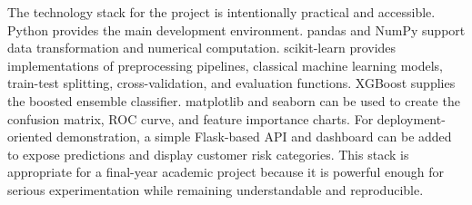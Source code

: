 The technology stack for the project is intentionally practical and accessible. Python provides the main development environment. pandas and NumPy support data transformation and numerical computation. scikit-learn provides implementations of preprocessing pipelines, classical machine learning models, train-test splitting, cross-validation, and evaluation functions. XGBoost supplies the boosted ensemble classifier. matplotlib and seaborn can be used to create the confusion matrix, ROC curve, and feature importance charts. For deployment-oriented demonstration, a simple Flask-based API and dashboard can be added to expose predictions and display customer risk categories. This stack is appropriate for a final-year academic project because it is powerful enough for serious experimentation while remaining understandable and reproducible.
